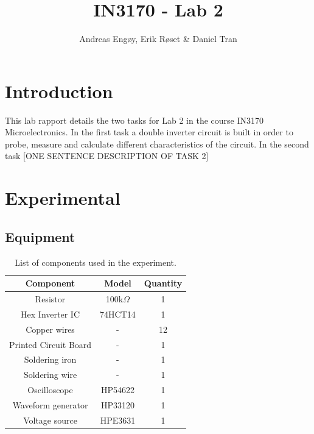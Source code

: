 \documentclass[onecolumn]{article}
\title{IN3170 - Lab 2}
\author{Andreas Engøy, Erik Røset \& Daniel Tran}
\date{\monthname[\the\month] \the\year}
\begin{document}
\maketitle

\section*{Introduction}
This lab rapport details the two tasks for Lab 2 in the course IN3170 Microelectronics. In the first task a double inverter circuit is built in order to probe, measure and calculate different characteristics of the circuit. In the second task [ONE SENTENCE DESCRIPTION OF TASK 2]

\section*{Experimental}
\subsection*{Equipment}
\begin{table}[h!]
    \centering
    \begin{tabular}{|c|c|c|}
        \hline
        \textbf{Component} & \textbf{Model} & \textbf{Quantity} \\
        \hline
        Resistor & 100k$\Omega$ & 1 \\
        Hex Inverter IC & 74HCT14 & 1 \\
        Copper wires & - & 12 \\
        Printed Circuit Board & - & 1 \\
        Soldering iron & - & 1 \\
        Soldering wire & - & 1 \\
        Oscilloscope & HP54622 & 1 \\
        Waveform generator  & HP33120 & 1 \\
        Voltage source & HPE3631 & 1 \\ 
        \hline
    \end{tabular}
    \caption{List of components used in the experiment.}
    \label{tab:bom}
\end{table}
\end{document}
